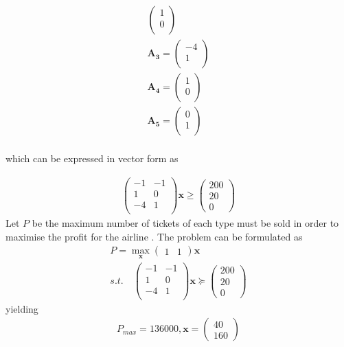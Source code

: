 \documentclass[10pt,twocolumn]{article}
\let\vec\mathbf
\newcommand{\myvec}[1]{\ensuremath{\begin{pmatrix}#1\end{pmatrix}}}
\begin{document}
{\begin{flushleft}
\begin{align}
\begin{pmatrix}
1 \\
0 \\
\end{pmatrix} \\
\vec{A_3} = 
\begin{pmatrix}
-4 \\
1 \\
\end{pmatrix} \\
\vec{A_4} = 
\begin{pmatrix}
1 \\
0 \\
\end{pmatrix} \\
\vec{A_5} = 
\begin{pmatrix}
0 \\
1 \\
\end{pmatrix} \\
\end{align}
\begin{flushleft}
which can be expressed in vector form as
\end{flushleft}
\begin{align}
 \myvec{-1 &-1 \\ 1 & 0 \\ -4 & 1 \\} \vec{x}\ge \myvec{200 \\ 20 \\ 0}
\end{align}
\fi
Let $P$ be the maximum number of tickets of each type must be sold in order to maximise the profit for the airline . The problem can be formulated as
\begin{align}
	P = \max_{\vec{x}}\myvec{1 & 1}\vec{x}
	\\
	s.t. \quad
 \myvec{-1 &-1 \\ 1 & 0 \\ -4 & 1 \\} \vec{x}\succeq \myvec{200 \\ 20 \\ 0}
\end{align}
yielding
\begin{align}
	P_{max} = 136000, 
	\vec{x} = \myvec{40 \\ 160}
\end{align}
	\begin{figure}[!ht]
		\centering

\end{figure}
\end{flushleft}}
\end{document}
